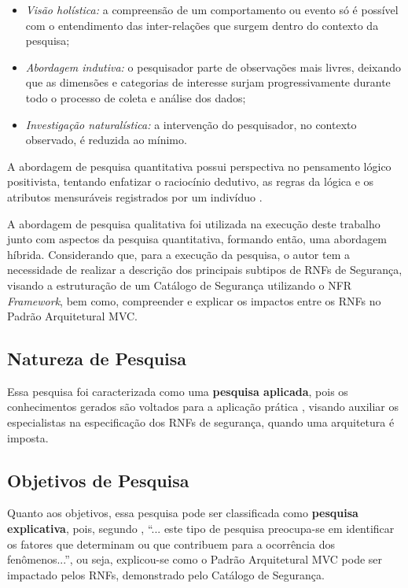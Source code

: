 \begin{itemize}
	\item \textit{Visão holística:} a compreensão de um comportamento ou evento só é possível com o entendimento das inter-relações que surgem dentro do contexto da pesquisa;
	\item \textit{Abordagem indutiva:} o pesquisador parte de observações mais livres, deixando que as dimensões e categorias de interesse surjam progressivamente durante todo o processo de coleta e análise dos dados;
	\item \textit{Investigação naturalística:} a intervenção do pesquisador, no contexto observado, é reduzida ao mínimo.
\end{itemize}

A abordagem de pesquisa quantitativa possui perspectiva no pensamento lógico positivista, tentando enfatizar o raciocínio dedutivo, as regras da lógica e os atributos mensuráveis registrados por um indivíduo \cite{gerhardt2009metodos}. 

A abordagem de pesquisa qualitativa foi utilizada na execução deste trabalho junto com aspectos da pesquisa quantitativa, formando então, uma abordagem híbrida. Considerando que, para a execução da pesquisa, o autor tem a necessidade de realizar a descrição dos principais subtipos de RNFs de Segurança, visando a estruturação de um Catálogo de Segurança utilizando o NFR \textit{Framework}, bem como, compreender e explicar os impactos entre os RNFs no Padrão Arquitetural MVC.  

\subsection{Natureza de Pesquisa}
\label{sub:naturezaDePesquisa}

Essa pesquisa foi caracterizada como uma \textbf{pesquisa aplicada}, pois os conhecimentos gerados são voltados para a aplicação prática \cite{gerhardt2009metodos}, visando auxiliar os especialistas na especificação dos RNFs de segurança, quando uma arquitetura é imposta. 

\subsection{Objetivos de Pesquisa}
\label{sub:objetivosDePesquisa}

Quanto aos objetivos, essa pesquisa pode ser classificada como \textbf{pesquisa explicativa}, pois, segundo \cite{gil2002elaborar}, “... este tipo de pesquisa preocupa-se em identificar os fatores que determinam ou que contribuem para a ocorrência dos fenômenos...”, ou seja, explicou-se como o Padrão Arquitetural MVC pode ser impactado pelos RNFs, demonstrado pelo Catálogo de Segurança.

